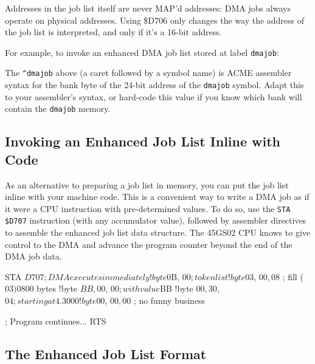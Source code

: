 Addresses in the job list itself are never MAP'd addresses: DMA jobs always
operate on physical addresses. Using \$D706 only changes the way the
address of the job list is interpreted, and only if it's a 16-bit address.

For example, to invoke an enhanced DMA job list stored at label {\tt dmajob}:


The {\tt \^{}dmajob} above (a caret followed by a symbol name) is ACME
assembler syntax for the bank byte of the 24-bit address of the {\tt dmajob}
symbol. Adapt this to your assembler's syntax, or hard-code this value if you
know which bank will contain the {\tt dmajob} memory.

\subsection{Invoking an Enhanced Job List Inline with Code}

As an alternative to preparing a job list in memory, you can put the job list
inline with your machine code. This is a convenient way to write a DMA job as
if it were a CPU instruction with pre-determined values. To do so, use the
\texttt{STA \$D707} instruction (with any accumulator value), followed by assembler
directives to assemble the enhanced job list data structure. The 45GS02 CPU
knows to give control to the DMA and advance the program counter beyond the end
of the DMA job data.

\begin{asmcode}
STA $D707  ; DMA executes immediately
!byte $0B, $00       ; token list
!byte $03, $00, $08  ; fill ($03) $0800 bytes
!byte $BB, $00, $00  ; with value $BB
!byte $00, $30, $04  ; starting at 4.3000
!byte $00, $00, $00  ; no funny business

; Program continues...
RTS
\end{asmcode}

\subsection{The Enhanced Job List Format}


